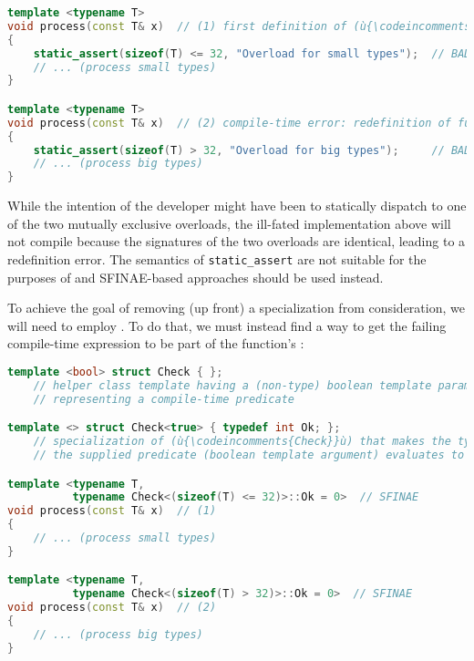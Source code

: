 \begin{lstlisting}[language=C++]
template <typename T>
void process(const T& x)  // (1) first definition of (ù{\codeincomments{process}}ù) function
{
    static_assert(sizeof(T) <= 32, "Overload for small types");  // BAD IDEA
    // ... (process small types)
}

template <typename T>
void process(const T& x)  // (2) compile-time error: redefinition of function
{
    static_assert(sizeof(T) > 32, "Overload for big types");     // BAD IDEA
    // ... (process big types)
}
\end{lstlisting}
    
\noindent While the intention of the developer might have been to statically
dispatch to one of the two mutually exclusive overloads, the ill-fated
implementation above will not compile because the signatures of the two
overloads are identical, leading to a redefinition error. The semantics
of \lstinline!static_assert! are not suitable for the purposes of
 and SFINAE-based approaches should be used instead. 

To achieve the goal of removing (up
front) a specialization from consideration, we will need to employ
. To do that, we must instead find a way to get the
failing compile-time expression to be part of the function's
:

\begin{lstlisting}[language=C++]
template <bool> struct Check { };
    // helper class template having a (non-type) boolean template parameter
    // representing a compile-time predicate

template <> struct Check<true> { typedef int Ok; };
    // specialization of (ù{\codeincomments{Check}}ù) that makes the type (ù{\codeincomments{Ok}}ù) manifest *only* if
    // the supplied predicate (boolean template argument) evaluates to (ù{\codeincomments{true}}ù)

template <typename T,
          typename Check<(sizeof(T) <= 32)>::Ok = 0>  // SFINAE
void process(const T& x)  // (1)
{
    // ... (process small types)
}

template <typename T,
          typename Check<(sizeof(T) > 32)>::Ok = 0>  // SFINAE
void process(const T& x)  // (2)
{
    // ... (process big types)
}
\end{lstlisting}
    
